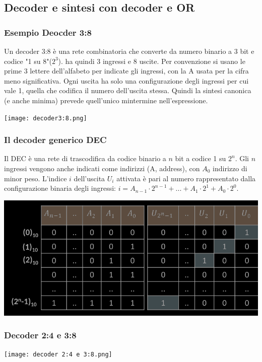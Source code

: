 \documentclass{article}
\begin{document}
\subsection{Decoder e sintesi con decoder e OR}
\subsubsection{Esempio Deocder 3:8}
Un decoder 3:8 è una rete combinatoria che converte da numero binario a 3 bit e codice "1 su 8"($2^3$). ha quindi 3 ingressi e 8 uscite. Per convenzione si usano le prime 3 lettere dell'alfabeto per indicate gli ingressi, con la A usata per la cifra meno significativa. Ogni uscita ha solo una configurazione degli ingressi per cui vale 1, quella che codifica il numero dell’uscita stessa. Quindi la sintesi canonica (e anche minima) prevede quell'unico mintermine nell'espressione.
\begin{center}
    \texttt{[image: decoder3:8.png]}
\end{center}
\subsubsection{Il decoder generico DEC}
Il DEC è una rete di trascodifica da codice binario a $n$ bit a codice 1 su $2^n$. Gli $n$ ingressi vengono anche indicati come indirizzi (A, address), con $A_0$ indirizzo di minor peso.
L’indice $i$ dell’uscita $U_i$ attivata è pari al numero rappresentato dalla configurazione binaria degli ingressi: $ i = A_{n-1} \cdot 2^{n-1} + ... + A_1 \cdot2^1 + A_0 \cdot 2^0 $.
\begin{center}
    \includegraphics[scale=0.7]{tabDec.png}
\end{center}



\subsubsection{Decoder 2:4 e 3:8}
\begin{center}
    \texttt{[image: decoder 2:4 e 3:8.png]}
\end{center}
\end{document}
